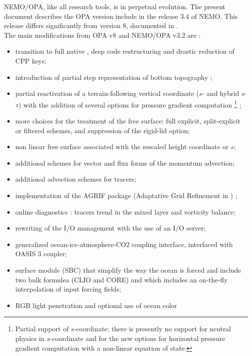 \documentclass[../main/NEMO_manual]{subfiles}
\begin{document}
NEMO/OPA, like all research tools, is in perpetual evolution.
The present document describes the OPA version include in the release 3.4 of NEMO.
This release differs significantly from version 8, documented in \citet{Madec1998}. \\

The main modifications from OPA v8 and NEMO/OPA v3.2 are :

\begin{itemize}
\item
  transition to full native \fninety, deep code restructuring and drastic reduction of CPP keys; 
\item
  introduction of partial step representation of bottom topography
  \citep{Barnier_al_OD06, Le_Sommer_al_OM09, Penduff_al_OS07};
\item
  partial reactivation of a terrain-following vertical coordinate ($s$- and hybrid $s$-$z$) with
  the addition of several options for pressure gradient computation
  \footnote{
    Partial support of $s$-coordinate: there is presently no support for neutral physics in
    $s$-coordinate and for the new options for horizontal pressure gradient computation with
    a non-linear equation of state.
  }
  ;
\item
  more choices for the treatment of the free surface: full explicit, split-explicit or filtered schemes,
  and suppression of the rigid-lid option;
\item
  non linear free surface associated with the rescaled height coordinate \zstar or $s$;
\item
  additional schemes for vector and flux forms of the momentum advection;
\item
  additional advection schemes for tracers;
\item
  implementation of the AGRIF package (Adaptative Grid Refinement in \fortran) \citep{Debreu_al_CG2008};
\item
  online diagnostics : tracers trend in the mixed layer and vorticity balance;
\item
  rewriting of the I/O management with the use of an I/O server;
\item
  generalized ocean-ice-atmosphere-CO2 coupling interface, interfaced with OASIS 3 coupler;
\item
  surface module (SBC) that simplify the way the ocean is forced and include two bulk formulea (CLIO and CORE) and
  which includes an on-the-fly interpolation of input forcing fields;
\item
  RGB light penetration and optional use of ocean color 

\end{itemize}
\end{document}
